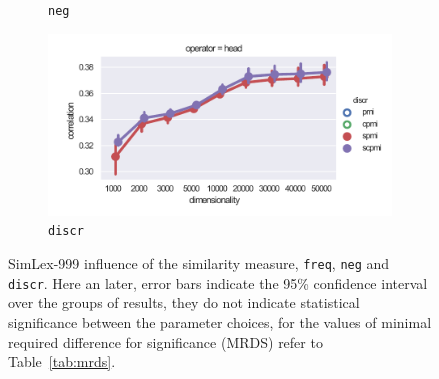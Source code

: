 \begin{figure}
\begin{subfigure}[t]{0.49\textwidth}
  \caption{\texttt{neg}}
  \label{fig:SimLex999-neg}
  \end{subfigure}
  \begin{subfigure}[t]{0.49\textwidth}
  \includegraphics[width=\textwidth]{supplement/figures/SimLex999-interaction-discr}

  \caption{\texttt{discr}}
  \label{fig:SimLex999-discr}
  \end{subfigure}
  
  \caption[SimLex-999 influence of the similarity measure, \texttt{freq}, \texttt{neg} and \texttt{discr}]{SimLex-999 influence of the similarity measure, \texttt{freq}, \texttt{neg} and \texttt{discr}. Here an later, error bars indicate the 95\% confidence interval over the groups of results, they do not indicate statistical significance between the parameter choices, for the values of minimal required difference for significance (MRDS) refer to Table~\ref{tab:mrds}.}
\end{figure}

